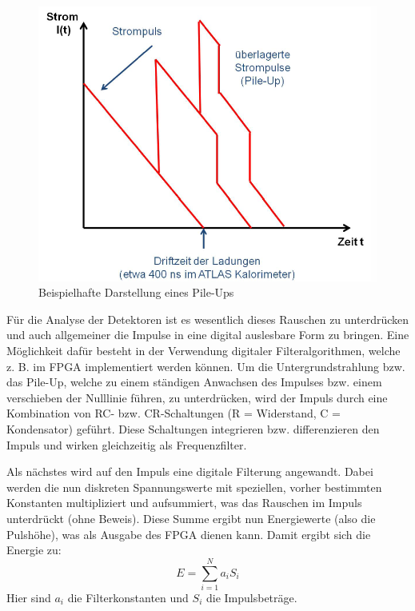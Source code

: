 \begin{figure}[h]
  \includegraphics[width=\linewidth]{../Daten/pileup.png}
  \caption{Beispielhafte Darstellung eines Pile-Ups \cite{Anleitung}}
  \label{pileup}
\end{figure}
Für die Analyse der Detektoren ist es wesentlich dieses Rauschen zu unterdrücken und auch allgemeiner die Impulse in eine digital auslesbare Form zu bringen.
Eine Möglichkeit dafür besteht in der Verwendung digitaler Filteralgorithmen, welche z. B. im FPGA implementiert werden können.
Um die Untergrundstrahlung bzw. das Pile-Up, welche zu einem ständigen Anwachsen des Impulses bzw. einem verschieben der Nulllinie führen, zu unterdrücken, wird der Impuls durch eine Kombination von RC- bzw. CR-Schaltungen (R = Widerstand, C = Kondensator) geführt.
Diese Schaltungen \glqq integrieren\grqq{} bzw. \glqq differenzieren\grqq{} den Impuls und wirken gleichzeitig als Frequenzfilter.

Als nächstes wird auf den Impuls eine \glqq digitale Filterung\grqq{} angewandt.
Dabei werden die nun diskreten Spannungswerte mit speziellen, vorher bestimmten Konstanten multipliziert und aufsummiert, was das Rauschen im Impuls unterdrückt (ohne Beweis).
Diese Summe ergibt nun Energiewerte (also die Pulshöhe), was als Ausgabe des FPGA dienen kann.
Damit ergibt sich die Energie zu:
\begin{equation}
E = \sum_{i = 1}^{N} a_i S_i
\end{equation}
Hier sind $a_i$ die Filterkonstanten und $S_i$ die Impulsbeträge.

